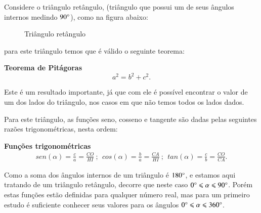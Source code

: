   Considere o triângulo retângulo, (triângulo que possui um de seus ângulos internos medindo $90 \degree$), como na figura abaixo:
  \begin{figure}[H]
   \centering
   \caption{Triângulo retângulo}
  \end{figure}
 para este triângulo temos que é válido o seguinte teorema:

 \vskip0.3cm

\colorbox{azul}{
 \begin{minipage}{0.9\linewidth}
 \begin{center}
 \textbf{Teorema de Pitágoras}
  \[a^2= b^2 + c^2.\]
 \end{center}
 \end{minipage}}

 \vskip0.3cm

 Este é um resultado importante, já que com ele é possível encontrar o valor de um dos lados do triângulo, nos casos em que não temos todos os lados dados.

 Para este triângulo, as funções seno, cosseno e tangente são dadas pelas seguintes razões trigonométricas, nesta ordem:

 \vskip0.3cm

\colorbox{azul}{
 \begin{minipage}{0.9\linewidth}
 \begin{center}
 \textbf{Funções trigonométricas}
  \begin{eqnarray*}
   sen(\alpha)= \frac{c}{a}= \frac{CO}{HI} \ ; \ \ cos(\alpha)= \frac{b}{a}= \frac{CA}{HI} \ ; \ \ tan(\alpha)= \frac{c}{b}= \frac{CO}{CA}.
 \end{eqnarray*}
 \end{center}
 \end{minipage}}

 \vskip0.3cm

 Como a soma dos ângulos internos de um triângulo é $180 \degree$, e estamos aqui tratando de um triângulo retângulo, decorre que neste caso $0 \degree \leqslant \alpha \leqslant 90 \degree$. Porém estas funções estão definidas para qualquer número real, mas para um primeiro estudo é suficiente conhecer seus valores para os ângulos $0 \degree \leqslant \alpha \leqslant 360 \degree$.

